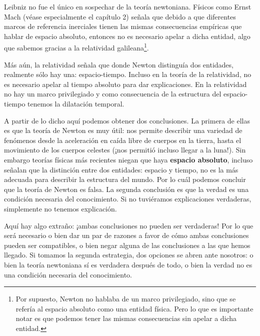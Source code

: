 \documentclass{article}
\begin{document}
Leibniz no fue el único en sospechar de la teoría newtoniana. Físicos como Ernst Mach (véase especialmente el capítulo 2) \citeyear{Mach2013} señala que debido a que diferentes marcos de referencia inerciales tienen las mismas consecuencias empíricas que hablar de espacio absoluto, entonces no es necesario apelar a dicha entidad, algo que sabemos gracias a la relatividad galileana\footnote{Por supuesto, Newton no hablaba de un marco privilegiado, sino que se refería al espacio absoluto como una entidad física. Pero lo que es importante notar es que podemos tener las mismas consecuencias sin apelar a dicha entidad.}.

Más aún, la relatividad señala que donde Newton distinguía dos entidades, realmente sólo hay una: espacio-tiempo. Incluso en la teoría de la relatividad, no es necesario apelar al tiempo absoluto para dar explicaciones. En la relatividad no hay un marco privilegiado y como consecuencia de la estructura del espacio-tiempo tenemos la dilatación temporal.

A partir de lo dicho aquí podemos obtener dos conclusiones. La primera de ellas es que la teoría de Newton es muy útil: nos permite describir una variedad de fenómenos desde la aceleración en caída libre de cuerpos en la tierra, hasta el movimiento de los cuerpos celestes (¡nos permitió incluso llegar a la luna!). Sin embargo teorías físicas más recientes niegan que haya \textbf{espacio absoluto}, incluso señalan que la distinción entre dos entidades: espacio y tiempo, no es la más adecuada para describir la estructura del mundo. Por lo cuál podemos concluir que la teoría de Newton es falsa. La segunda conclusión es que la verdad es una condición necesaria del conocimiento. Si no tuviéramos explicaciones verdaderas, simplemente no tenemos explicación. 

Aquí hay algo extraño: ¡ambas conclusiones no pueden ser verdaderas! Por lo que será necesario o bien dar un par de razones a favor de cómo ambas conclusiones pueden ser compatibles, o bien negar alguna de las conclusiones a las que hemos llegado. Si tomamos la segunda estrategia, dos opciones se abren ante nosotros: o bien la teoría newtoniana sí es verdadera después de todo, o bien la verdad no es una condición necesaria del conocimiento.
\end{document}

